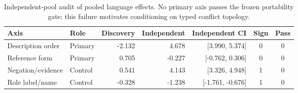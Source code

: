 \begin{table}[H]
\centering
\footnotesize
\setlength{\tabcolsep}{4pt}
\begin{tabularx}{\textwidth}{Xlrrrcc}
\toprule
Axis & Role & Discovery & Independent & Independent CI & Sign & Pass \\
\midrule
Description order & Primary & -2.132 & 4.678 & [3.990, 5.374] & 0 & 0 \\
Reference form & Primary & 0.705 & -0.227 & [-0.762, 0.306] & 0 & 0 \\
Negation/evidence & Control & 0.541 & 4.143 & [3.326, 4.948] & 1 & 0 \\
Role label/name & Control & -0.328 & -1.238 & [-1.761, -0.676] & 1 & 0 \\
\bottomrule
\end{tabularx}
\caption{Independent-pool audit of pooled language effects. No primary axis passes the frozen portability gate; this failure motivates conditioning on typed conflict topology.}
\label{tab:cross-pool}
\end{table}
